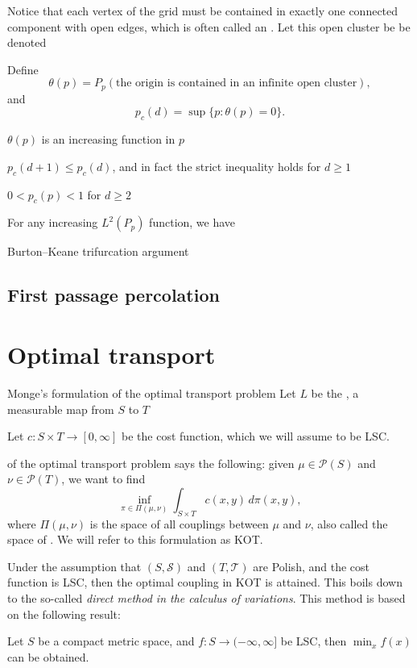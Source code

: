 Notice that each vertex of the grid must be contained in exactly one connected component with open edges, which is often called an . Let this open cluster be be denoted 

Define \[\theta(p) = P_p (\text{the origin is contained in an infinite open cluster}),\] and \[
    p_c(d) = \sup\{p : \theta(p) = 0\}.
\]

$\theta(p)$ is an increasing function in $p$

$p_c(d+1) \leq p_c(d)$, and in fact the strict inequality holds for $d \geq 1$

$0 < p_c(p) < 1$ for $d \geq 2$

For any increasing $L^2(P_p)$ function, we have 

Burton--Keane trifurcation argument

\subsection{First passage percolation} \label{sec:FPP}

\section{Optimal transport} \label{sec:ot}

Monge's formulation of the optimal transport problem
Let $L$ be the , a measurable map from $S$ to $T$


Let $c\colon S \times T \to [0,\infty]$ be the cost function, which we will assume to be LSC. 

 of the optimal transport problem says the following: given $\mu \in \mathcal P(S)$ and $\nu \in \mathcal{P} (T)$, we want to find \[
    \inf_{\pi \in \Pi(\mu ,\nu)}\int_{S \times T} c(x,y)\,d\pi(x,y),
\] where $\Pi(\mu,\nu)$ is the space of all couplings between $\mu$ and $\nu$, also called the space of . We will refer to this formulation as KOT.

Under the assumption that $(S,\mathcal S)$ and $(T,\mathcal T)$ are Polish, and the cost function is LSC, then the optimal coupling in KOT is attained. This boils down to the so-called \emph{direct method in the calculus of variations}. This method is based on the following result: \begin{thm}
    Let $S$ be a compact metric space, and $f\colon S \to (-\infty,\infty]$ be LSC, then $\min_x f(x)$ can be obtained.
\end{thm}

